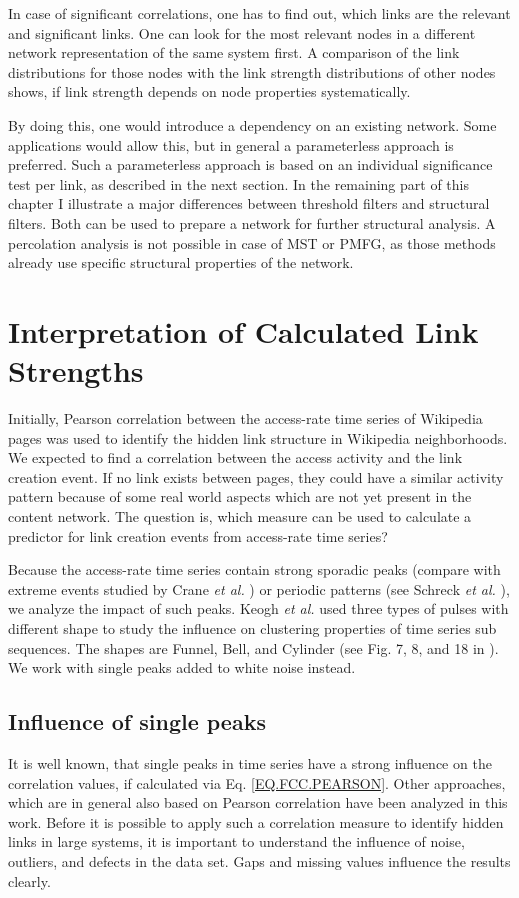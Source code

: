 \documentclass[a4paper,10pt]{scrbook}
\begin{document}
In case of significant correlations, one has to find out, which links are the relevant and significant links. One can look for the most relevant nodes in a different network representation of the same system first. A comparison of the link distributions for those nodes with the link strength distributions of other nodes shows, if link strength depends on node properties systematically. 

By doing this, one would introduce a dependency on an existing network. Some applications would allow this, but in general a parameterless approach is preferred. Such a parameterless approach is based on an individual significance test per link, as described in the next section. In the remaining part of this chapter I illustrate a major differences between threshold filters and structural filters. Both can be used to prepare a network for further structural analysis. A percolation analysis is not possible in case of MST or PMFG, as those methods already use specific structural properties of the network.
 
\section{Interpretation of Calculated Link Strengths}
Initially, Pearson correlation between the access-rate time series of Wikipedia pages was used to identify the hidden link structure in Wikipedia neighborhoods. We expected to find a correlation between the access activity and the link creation event. If no link exists between pages, they could have a similar activity pattern because of some real world aspects which are not yet present in the content network. The question is, which measure can be used to calculate a predictor for link creation events from access-rate time series?

Because the access-rate time series contain strong sporadic peaks (compare with extreme events studied by Crane \textit{et al.} \cite{Crane14102008}) or periodic patterns (see Schreck \textit{et al.} \cite{Schreck.REPORT}), we analyze the impact of such peaks. Keogh \textit{et al.} \cite{Keogh2005} used three types of pulses with different shape to study the influence on clustering properties of time series sub sequences. The shapes are Funnel, Bell, and Cylinder (see Fig. 7, 8, and 18 in \cite{Keogh2005}). We work with single peaks added to white noise instead.

\subsection{Influence of single peaks}
It is well known, that single peaks in time series have a strong influence on the correlation values, if calculated via Eq. \ref{EQ.FCC.PEARSON}. Other approaches, which are in general also based on Pearson correlation have been analyzed in this work. Before it is possible to apply such a correlation measure to identify hidden links in large systems, it is important to understand the influence of noise, outliers, and defects in the data set. Gaps and missing values influence the results clearly. 
\end{document}

